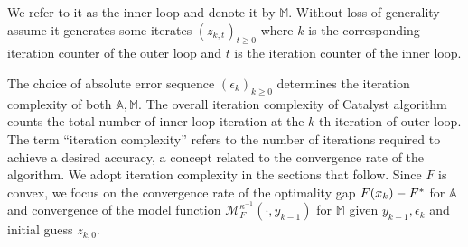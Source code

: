 \documentclass[12pt]{article}
\begin{document}
        We refer to it as the inner loop and denote it by $\mathbb M$. 
        Without loss of generality assume it generates some iterates $(z_{k, t})_{t \ge 0}$ where $k$ is the corresponding iteration counter of the outer loop and $t$ is the iteration counter of the inner loop. 
        \par 
        The choice of absolute error sequence $(\epsilon_k)_{k \ge 0}$ determines the iteration complexity of both $\mathbb A, \mathbb M$. 
        The overall iteration complexity of Catalyst algorithm counts the total number of inner loop iteration at the $k$ th iteration of outer loop. 
        The term ``iteration complexity'' refers to the number of iterations required to achieve a desired accuracy, a concept related to the convergence rate of the algorithm. 
        We adopt iteration complexity in the sections that follow. 
        Since $F$ is convex, we focus on the convergence rate of the optimality gap $F(x_k) - F^*\*$ for $\mathbb A$ and convergence of the model function $\mathcal M_F^{\kappa^{-1}}(\cdot, y_{k - 1})$ for $\mathbb M$ given $y_{k - 1}, \epsilon_k$ and initial guess $z_{k, 0}$. 
        \par
\end{document}

